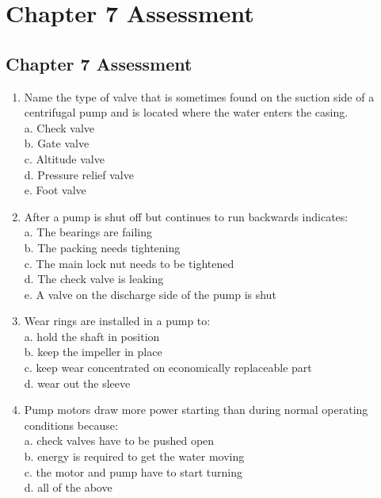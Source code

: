 
\chapter*{Chapter 7 Assessment}

\section*{Chapter 7 Assessment}
\begin{enumerate}[1.]
\item Name the type of valve that is sometimes found on the suction side of a centrifugal pump and is located where the water enters the casing.\\
a. Check valve\\
b. Gate valve\\
c. Altitude valve\\
d. Pressure relief valve\\
e. Foot valve\\
\item After a pump is shut off but continues to run backwards indicates:\\
a. The bearings are failing\\
b. The packing needs tightening\\
c. The main lock nut needs to be tightened\\
d. The check valve is leaking\\
e. A valve on the discharge side of the pump is shut\\
\item Wear rings are installed in a pump to:\\
a. hold the shaft in position\\
b. keep the impeller in place\\
c. keep wear concentrated on economically replaceable part\\
d. wear out the sleeve\\
\item Pump motors draw more power starting than during normal operating conditions because:\\
a. check valves have to be pushed open\\
b. energy is required to get the water moving\\
c. the motor and pump have to start turning\\
d. all of the above\\

\end{enumerate}

